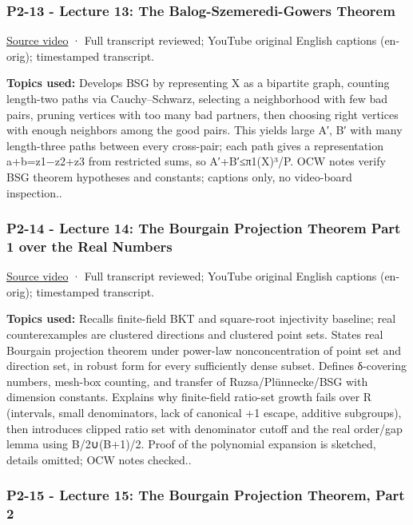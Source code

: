 \subsubsection{P2-13 - Lecture 13: The Balog-Szemeredi-Gowers Theorem}\label{04-visual-computing-ii-ch036-p2-13---lecture-13-the-balog-szemeredi-gowers-theorem}

\href{https://www.youtube.com/watch?v=DGBuM5pEdoo}{Source video} · Full transcript reviewed; YouTube original English captions (en-orig); timestamped transcript.

\textbf{Topics used:} Develops BSG by representing X as a bipartite graph, counting length-two paths via Cauchy--Schwarz, selecting a neighborhood with few bad pairs, pruning vertices with too many bad partners, then choosing right vertices with enough neighbors among the good pairs. This yields large A′, B′ with many length-three paths between every cross-pair; each path gives a representation a+b=z1−z2+z3 from restricted sums, so \textbar A′+B′\textbar≤\textbar π1(X)\textbar³/P. OCW notes verify BSG theorem hypotheses and constants; captions only, no video-board inspection..

\subsubsection{P2-14 - Lecture 14: The Bourgain Projection Theorem Part 1 over the Real Numbers}\label{04-visual-computing-ii-ch036-p2-14---lecture-14-the-bourgain-projection-theorem-part-1-over-the-real-numbers}

\href{https://www.youtube.com/watch?v=0UYCJ0cjG9k}{Source video} · Full transcript reviewed; YouTube original English captions (en-orig); timestamped transcript.

\textbf{Topics used:} Recalls finite-field BKT and square-root injectivity baseline; real counterexamples are clustered directions and clustered point sets. States real Bourgain projection theorem under power-law nonconcentration of point set and direction set, in robust form for every sufficiently dense subset. Defines δ-covering numbers, mesh-box counting, and transfer of Ruzsa/Plünnecke/BSG with dimension constants. Explains why finite-field ratio-set growth fails over R (intervals, small denominators, lack of canonical +1 escape, additive subgroups), then introduces clipped ratio set with denominator cutoff and the real order/gap lemma using B/2∪(B+1)/2. Proof of the polynomial expansion is sketched, details omitted; OCW notes checked..

\subsubsection{P2-15 - Lecture 15: The Bourgain Projection Theorem, Part 2}\label{04-visual-computing-ii-ch036-p2-15---lecture-15-the-bourgain-projection-theorem-part-2}

